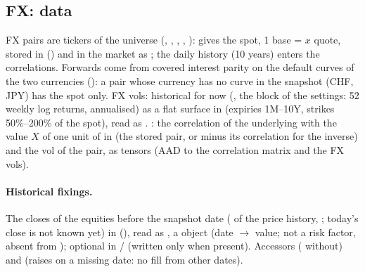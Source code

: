 \subsection{FX: data}\label{sec:arch-fx-data}
FX pairs are  tickers of the universe (, , , ,
):  gives the spot, 1 base = $x$ quote, stored in  () and in the market as ; the daily  history (10 years) enters the
correlations. Forwards come from covered interest parity on the default curves of the two currencies
(): a pair whose currency has no curve in the snapshot (CHF, JPY) has the spot only. FX vols:
historical for now (, the  block of the settings: 52 weekly
log returns, annualised) as a flat surface in  (expiries 1M--10Y, strikes 50\%--200\% of the spot),
read as . : the correlation of the
underlying with the value $X$ of one unit of  in  (the stored pair, or minus its
correlation for the inverse) and the vol of the pair, as tensors (AAD to the correlation matrix and the FX vols).

\paragraph{Historical fixings.} The closes of the equities before the snapshot date ( of the price
history, ; today's close is not known yet) in 
(), read as , a  object (date $\to$
value; not a risk factor, absent from ); optional in  / 
(written only when present). Accessors  ( without) and
 (raises on a missing date: no fill from other dates).


